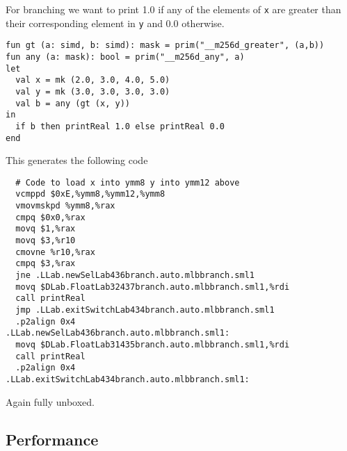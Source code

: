 \documentclass{article}
\begin{document}
For branching we want to print 1.0 if any of the elements of \verb!x! are greater than their corresponding element in \verb!y! and 0.0 otherwise.

\begin{lstlisting}
fun gt (a: simd, b: simd): mask = prim("__m256d_greater", (a,b))
fun any (a: mask): bool = prim("__m256d_any", a)
let
  val x = mk (2.0, 3.0, 4.0, 5.0)
  val y = mk (3.0, 3.0, 3.0, 3.0)
  val b = any (gt (x, y))
in 
  if b then printReal 1.0 else printReal 0.0
end
\end{lstlisting}

This generates the following code

\begin{verbatim}
  # Code to load x into ymm8 y into ymm12 above
  vcmppd $0xE,%ymm8,%ymm12,%ymm8
  vmovmskpd %ymm8,%rax
  cmpq $0x0,%rax
  movq $1,%rax
  movq $3,%r10
  cmovne %r10,%rax
  cmpq $3,%rax
  jne .LLab.newSelLab436branch.auto.mlbbranch.sml1
  movq $DLab.FloatLab32437branch.auto.mlbbranch.sml1,%rdi
  call printReal
  jmp .LLab.exitSwitchLab434branch.auto.mlbbranch.sml1
  .p2align 0x4
.LLab.newSelLab436branch.auto.mlbbranch.sml1:
  movq $DLab.FloatLab31435branch.auto.mlbbranch.sml1,%rdi
  call printReal
  .p2align 0x4
.LLab.exitSwitchLab434branch.auto.mlbbranch.sml1:
\end{verbatim}

Again fully unboxed.

\subsection{Performance}




\end{document}
